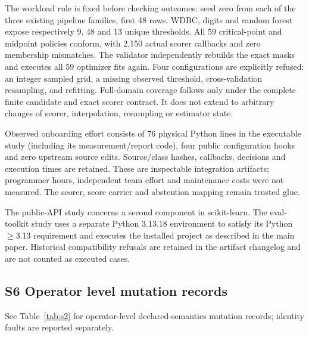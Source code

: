 \documentclass[11pt,a4paper]{article}
\theoremstyle{plain}
\theoremstyle{definition}
\theoremstyle{remark}
\begin{document}
The workload rule is fixed before checking outcomes: seed zero from each of the three existing pipeline families, first 48 rows. WDBC, digits and random forest expose respectively 9, 48 and 13 unique thresholds. All 59 critical-point and midpoint policies conform, with 2,150 actual scorer callbacks and zero membership mismatches. The validator independently rebuilds the exact masks and executes all 59 optimizer fits again. Four configurations are explicitly refused: an integer sampled grid, a missing observed threshold, cross-validation resampling, and refitting. Full-domain coverage follows only under the complete finite candidate and exact scorer contract. It does not extend to arbitrary changes of scorer, interpolation, resampling or estimator state.

Observed onboarding effort consists of 76 physical Python lines in the executable study (including its measurement/report code), four public configuration hooks and zero upstream source edits. Source/class hashes, callbacks, decisions and execution times are retained. These are inspectable integration artifacts; programmer hours, independent team effort and maintenance costs were not measured. The scorer, score carrier and abstention mapping remain trusted glue.

The public-API study concerns a second component in scikit-learn. The eval-toolkit study uses a separate Python 3.13.18 environment to satisfy its Python $\ge$3.13 requirement and executes the installed project as described in the main paper. Historical compatibility refusals are retained in the artifact changelog and are not counted as executed cases.


\subsection*{S6 Operator level mutation records}\label{sec:s6}

See Table~\ref{tab:s2} for operator-level declared-semantics mutation records; identity faults are reported separately.
\end{document}
